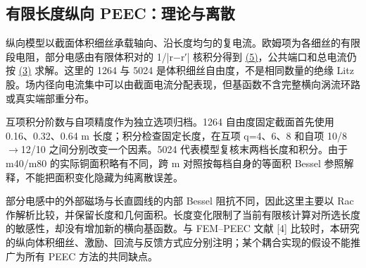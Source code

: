 \documentclass[11pt]{article}
\begin{document}
\subsection*{有限长度纵向 PEEC：理论与离散}
\hypertarget{02.peec_method.heading}{}
纵向模型以截面体积细丝承载轴向、沿长度均匀的复电流。欧姆项为各细丝的有限段电阻，部分电感由有限体积对的 1/|r−r′| 核积分得到 \href{paper_zh-CN_single.pdf#E08}{(5)}，公共端口和总电流仍按 \href{paper_zh-CN_single.pdf#E04}{(3)} 求解。这里的 1264 与 5024 是体积细丝自由度，不是相同数量的绝缘 Litz 股。场内径向电流集中可以由截面电流分配表现，但基函数不含完整横向涡流环路或真实端部重分布。


互项积分阶数与自项精度作为独立选项归档。1264 自由度固定截面首先使用 0.16、0.32、0.64 m 长度；积分检查固定长度，在互项 q=4、6、8 和自项 10/8\(\to\)12/10 之间分别改变一个因素。5024 代表模型复核末两档长度和积分。由于 m40/m80 的实际铜面积略有不同，跨 m 对照按每档自身的等面积 Bessel 参照解释，不能把面积变化隐藏为纯离散误差。


部分电感中的外部磁场与长直圆线的内部 Bessel 阻抗不同，因此这里主要以 Rac 作解析比较，并保留长度和几何面积。长度变化限制了当前有限核计算对所选长度的敏感性，却没有增加新的横向基函数。与 FEM–PEEC 文献 [4] 比较时，本研究的纵向体积细丝、激励、回流与反馈方式应分别注明；某个耦合实现的假设不能推广为所有 PEEC 方法的共同缺点。
\end{document}
